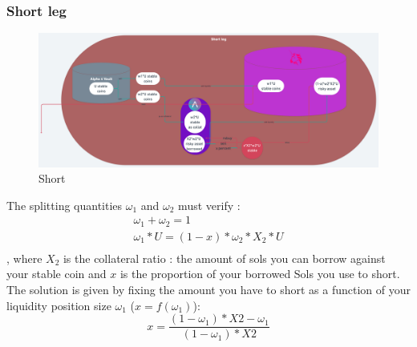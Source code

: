 \documentclass[conference]{IEEEtran}
\begin{document}
\subsubsection{Short leg}
\begin{figure}[h!]
    \centering
    \includegraphics[scale=0.035]{Plots/short_leg.png}
    \caption{Short}
    \label{fig:short_leg}
\end{figure}
The splitting quantities $\omega_1$ and $\omega_2$ must verify : 
\begin{equation}
\begin{array}{ll}
\omega_1 + \omega_2 = 1\\
\omega_1*U = (1-x)*\omega_2*X_2*U\\    
\end{array}
\end{equation}
, where $X_2$ is the collateral ratio : the amount of sols you can borrow against your stable coin and $x$ is the proportion of your borrowed Sols you use to short.\\
The solution is given by fixing the amount you have to short as a function of your liquidity position size $\omega_1$ ($x=f(\omega_1)$):
\begin{equation}
x = \frac{(1-\omega_1)*X2-\omega_1}{(1-\omega_1)*X2}
\end{equation}
\end{document}
